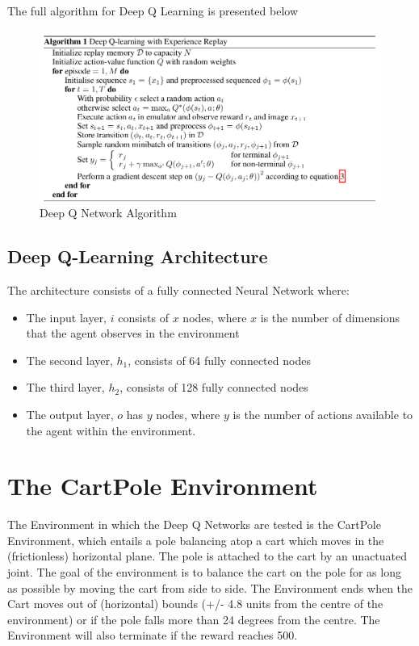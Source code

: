 \documentclass{article}
\begin{document}
The full algorithm for Deep Q Learning is presented below

\begin{figure}[H]
    \includegraphics[scale=0.4]{images/DQN_DeepMind_Alg.png}    \centering

    \caption{Deep Q Network Algorithm \cite{mnih2013atari}}
    \label{fig:dqn_alg}
\end{figure}


\subsection{Deep Q-Learning Architecture}

The architecture consists of a fully connected Neural Network where:

\begin{itemize}
    \item The input layer, $i$ consists of $x$ nodes, where $x$ is the number of dimensions that the agent observes in the environment
    
    \item The second layer, $h_1$, consists of 64 fully connected nodes
    
    \item The third layer, $h_2$, consists of 128 fully connected nodes
    
    \item The output layer, $o$ has $y$ nodes, where $y$ is the number of actions available to the agent within the environment.
\end{itemize}




\section{The CartPole Environment}

The Environment in which the Deep Q Networks are tested is the CartPole Environment\cite{brockman2016openai}, which entails a pole balancing atop a cart which moves in the (frictionless) horizontal plane. The pole is attached to the cart by an unactuated joint. The goal of the environment is to balance the cart on the pole for as long as possible by moving the cart from side to side. The Environment ends when the Cart moves out of (horizontal) bounds (+/- 4.8 units from the centre of the environment) or if the pole falls more than 24 degrees from the centre. The Environment will also terminate if the reward reaches 500.  
\end{document}
